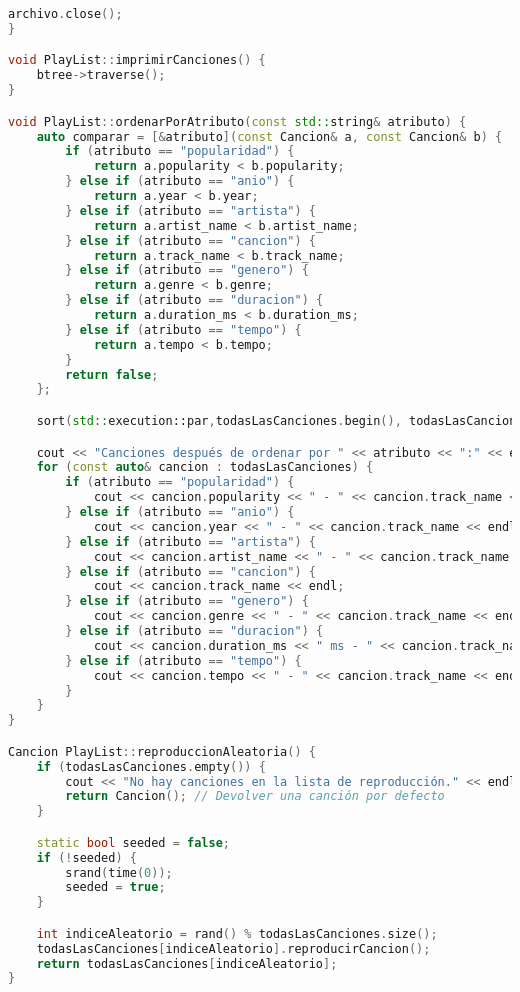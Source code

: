 \documentclass[corference]{IEEEtran}
\begin{document}
\begin{flushleft}
\begin{lstlisting}[language=C++, style=mystyle, caption={Código de la Clase Playlist}]
    archivo.close();
}

void PlayList::imprimirCanciones() {
    btree->traverse();
}

void PlayList::ordenarPorAtributo(const std::string& atributo) {
    auto comparar = [&atributo](const Cancion& a, const Cancion& b) {
        if (atributo == "popularidad") {
            return a.popularity < b.popularity;
        } else if (atributo == "anio") {
            return a.year < b.year;
        } else if (atributo == "artista") {
            return a.artist_name < b.artist_name;
        } else if (atributo == "cancion") {
            return a.track_name < b.track_name;
        } else if (atributo == "genero") {
            return a.genre < b.genre;
        } else if (atributo == "duracion") {
            return a.duration_ms < b.duration_ms;
        } else if (atributo == "tempo") {
            return a.tempo < b.tempo;
        }
        return false;
    };

    sort(std::execution::par,todasLasCanciones.begin(), todasLasCanciones.end(), comparar);

    cout << "Canciones después de ordenar por " << atributo << ":" << endl;
    for (const auto& cancion : todasLasCanciones) {
        if (atributo == "popularidad") {
            cout << cancion.popularity << " - " << cancion.track_name << endl;
        } else if (atributo == "anio") {
            cout << cancion.year << " - " << cancion.track_name << endl;
        } else if (atributo == "artista") {
            cout << cancion.artist_name << " - " << cancion.track_name << endl;
        } else if (atributo == "cancion") {
            cout << cancion.track_name << endl;
        } else if (atributo == "genero") {
            cout << cancion.genre << " - " << cancion.track_name << endl;
        } else if (atributo == "duracion") {
            cout << cancion.duration_ms << " ms - " << cancion.track_name << endl;
        } else if (atributo == "tempo") {
            cout << cancion.tempo << " - " << cancion.track_name << endl;
        }
    }
}

Cancion PlayList::reproduccionAleatoria() {
    if (todasLasCanciones.empty()) {
        cout << "No hay canciones en la lista de reproducción." << endl;
        return Cancion(); // Devolver una canción por defecto
    }

    static bool seeded = false;
    if (!seeded) {
        srand(time(0));
        seeded = true;
    }

    int indiceAleatorio = rand() % todasLasCanciones.size();
    todasLasCanciones[indiceAleatorio].reproducirCancion();
    return todasLasCanciones[indiceAleatorio];
}


\end{lstlisting}
\end{flushleft}
\end{document}
